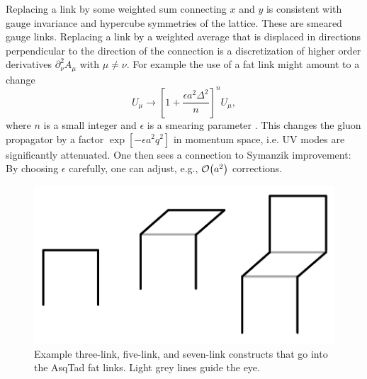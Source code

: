 Replacing a link by some weighted sum connecting $x$ and $y$ is consistent
with gauge invariance and hypercube symmetries of the lattice. These are
smeared gauge links. Replacing a link by a weighted average that is displaced
in directions perpendicular to the direction of the connection is a
discretization of higher order derivatives $\partial^2_\nu A_\mu$
\cite{blum_improving_1997} with $\mu\neq\nu$. For example the use of a
fat link might amount to a change
\begin{equation}
  U_\mu\to \left[1+\frac{\epsilon a^2 \Delta^2}{n}\right]^n U_\mu,
\end{equation} 
where $n$ is a small integer and $\epsilon$ is a smearing parameter
\cite{lepage:1997id}. This changes the gluon propagator by a factor
$\exp[-\epsilon a^2q^2]$ in momentum space, i.e. UV modes are 
significantly attenuated. One then sees a connection to Symanzik improvement:
By choosing $\epsilon$ carefully, one can adjust, e.g., 
$\order{a^2}$ corrections.

\begin{figure}
  \centering
  \includegraphics[width=0.6\linewidth]{figs/linkConstructs.pdf}
  \caption{Example three-link, five-link, and seven-link constructs that
           go into the AsqTad fat links. Light grey lines guide the eye.}
  \label{fig:AsqTadConstructs}
\end{figure}

